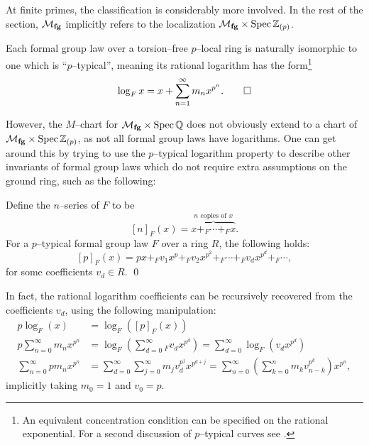 At finite primes, the classification is considerably more involved.  In the rest of the section, $\mathcal{M}_{\mathbf{fg}}$ implicitly refers to the localization $\mathcal{M}_{\mathbf{fg}} \times \operatorname{Spec} \mathbb Z_{(p)}$.
\begin{lemma}\label{AllFGLsCanBePTypical}
Each formal group law over a torsion--free $p$--local ring is naturally isomorphic to one which is ``$p$--typical'', meaning its rational logarithm has the form\footnote{An equivalent concentration condition can be specified on the rational exponential.  For a second discussion of $p$--typical curves see .} \[\log_F x = x + \sum_{n=1}^\infty m_n x^{p^n}. \qed\]
\end{lemma}

However, the $M$--chart for $\mathcal{M}_{\mathbf{fg}} \times \operatorname{Spec} \mathbb{Q}$ does not obviously extend to a chart of $\mathcal{M}_{\mathbf{fg}} \times \operatorname{Spec} \mathbb Z_{(p)}$, as not all formal group laws have logarithms.  One can get around this by trying to use the $p$--typical logarithm property to describe other invariants of formal group laws which do not require extra assumptions on the ground ring, such as the following:
\begin{theorem}\label{PSeriesHasArakisForm}
Define the $n$--series of $F$ to be \[[n]_F(x) = \overset{\text{$n$ copies of $x$}}{\overbrace{x +_F \cdots +_F x}}.\]  For a $p$--typical formal group law $F$ over a ring $R$, the following holds:
\[[p]_F(x) = px +_F v_1 x^p +_F v_2 x^{p^2} +_F \cdots +_F v_d x^{p^d} +_F \cdots,\] for some coefficients $v_d \in R$. \qed
\end{theorem}

\begin{remark}
In fact, the rational logarithm coefficients can be recursively recovered from the coefficients $v_d$, using the following manipulation:
\begin{align*}
p \log_F(x) & = \log_F\left([p]_F(x)\right) \\
p \sum_{n=0}^\infty m_n x^{p^n} & = \log_F \left(\sum_{d=0}^\infty{}_F v_d x^{p^d} \right) = \sum_{d=0}^\infty \log_F\left(v_d x^{p^d}\right) \\
\sum_{n=0}^\infty p m_n x^{p^n} & = \sum_{d=0}^\infty \sum_{j=0}^\infty m_j v_d^{p^j} x^{p^{d+j}} = \sum_{n=0}^\infty \left( \sum_{k=0}^n m_k v_{n-k}^{p^k} \right) x^{p^n},
\end{align*}
implicitly taking $m_0 = 1$ and $v_0 = p$.
\end{remark}

